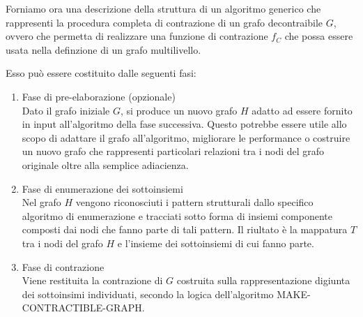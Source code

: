 
Forniamo ora una descrizione della struttura di un algoritmo generico che rappresenti la procedura completa di
contrazione di un grafo decontraibile $G$, ovvero che permetta di realizzare una funzione di contrazione $f_C$
che possa essere usata nella definzione di un grafo multilivello.

Esso pu\`o essere costituito dalle seguenti fasi:
\begin{enumerate}
    \item Fase di pre-elaborazione (opzionale) \\
    Dato il grafo iniziale $G$, si produce un nuovo grafo $H$ adatto ad essere fornito in input all'algoritmo
    della fase successiva.
    Questo potrebbe essere utile allo scopo di adattare il grafo all'algoritmo, migliorare le performance o
    costruire un nuovo grafo che rappresenti particolari relazioni tra i nodi del grafo originale oltre alla
    semplice adiacienza.
    \item Fase di enumerazione dei sottoinsiemi \\
    Nel grafo $H$ vengono riconosciuti i pattern strutturali dallo specifico algoritmo di enumerazione e tracciati
    sotto forma di insiemi componente composti dai nodi che fanno parte di tali pattern.
    Il riultato \`e la mappatura $T$ tra i nodi del grafo $H$ e l'insieme dei sottoinsiemi di cui fanno parte.
    \item Fase di contrazione \\
    Viene restituita la contrazione di $G$ costruita sulla rappresentazione digiunta dei sottoinsimi individuati,
    secondo la logica dell'algoritmo MAKE-CONTRACTIBLE-GRAPH\@.
\end{enumerate}



